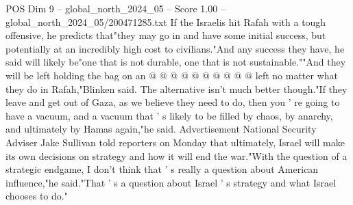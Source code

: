 \begin{textsample}{POS Dim 9 – global\_north\_2024\_05 – Score 1.00 – global\_north\_2024\_05/200471285.txt}
If the Israelis hit Rafah with a tough offensive, he predicts that"they may go in and have some initial success, but potentially at an incredibly high cost to civilians."And any success they have, he said will likely be"one that is not durable, one that is not sustainable.""And they will be left holding the bag on an @ @ @ @ @ @ @ @ @ @ left no matter what they do in Rafah,"Blinken said.
The alternative isn't much better though."If they leave and get out of Gaza, as we believe they need to do, then you ' re going to have a vacuum, and a vacuum that ' s likely to be filled by chaos, by anarchy, and ultimately by Hamas again,"he said.
Advertisement National Security Adviser Jake Sullivan told reporters on Monday that ultimately, Israel will make its own decisions on strategy and how it will end the war."With the question of a strategic endgame, I don't think that ' s really a question about American influence,"he said."That ' s a question about Israel ' s strategy and what Israel chooses to do."

\end{textsample}
